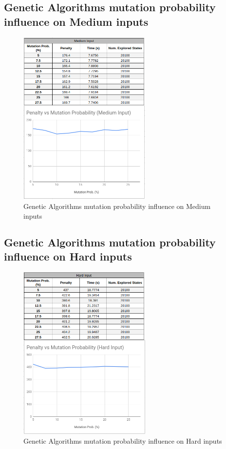 \documentclass[conference]{IEEEtran}
\begin{document}
\subsection{Genetic Algorithms mutation probability influence on Medium inputs}

\begin{figure}[H]
    \centerline{\includegraphics[width=250px]{mutation_prob_medium.png}}
    \caption{Genetic Algorithms mutation probability influence on Medium inputs}
\end{figure}

\subsection{Genetic Algorithms mutation probability influence on Hard inputs}

\begin{figure}[H]
    \centerline{\includegraphics[width=250px]{mutation_prob_hard.png}}
    \caption{Genetic Algorithms mutation probability influence on Hard inputs}
\end{figure}
\end{document}
